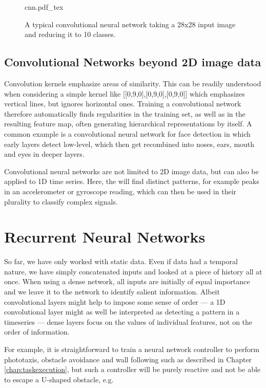 \begin{figure}[htb]
\tiny
    \centering
    \def\svgwidth{\textwidth}
    {cnn.pdf_tex}
    \caption{A typical convolutional neural network taking a 28x28 input image and reducing it to 10 classes.\label{fig:cnn}}
\end{figure}


\subsection{Convolutional Networks beyond 2D image data}

Convolution kernels emphasize areas of similarity. This can be readily understood when considering a simple kernel like [[0,9,0],[0,9,0],[0,9,0]] which emphasizes vertical lines, but ignores horizontal ones. Training a convolutional network therefore automatically finds regularities in the training set, as well as in the resulting feature map, often generating hierarchical representations by itself. A common example is a convolutional neural network for face detection in which early layers detect low-level, which then get recombined into noses, ears, mouth and eyes in deeper layers.

Convolutional neural networks are not limited to 2D image data, but can also be applied to 1D time series. Here, the will find distinct patterns, for example peaks in an accelerometer or gyroscope reading, which can then be used in their plurality to classify complex signals. 

\section{Recurrent Neural Networks}
So far, we have only worked with static data. Even if data had a temporal nature, we have simply concatenated inputs and looked at a piece of history all at once. When using a dense network, all inputs are initially of equal importance and we leave it to the network to identify salient information. Albeit convolutional layers might help to impose some sense of order --- a 1D convolutional layer might as well be interpreted as detecting a pattern in a timeseries --- dense layers focus on the values of individual features, not on the order of information. 

For example, it is straightforward to train a neural network controller to perform phototaxis, obstacle avoidance and wall following such as described in Chapter \ref{chap:taskexecution}, but such a controller will be purely reactive and not be able to escape a U-shaped obstacle, e.g.

